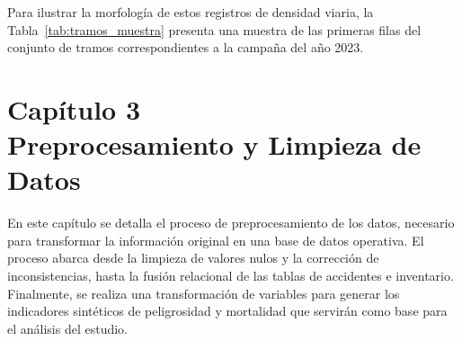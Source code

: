 \documentclass[twoside,a4paper,12pt,onecolumn,openany]{book}
\begin{document}
Para ilustrar la morfología de estos registros de densidad viaria, la Tabla~\ref{tab:tramos_muestra} presenta una muestra de las primeras filas del conjunto de tramos correspondientes a la campaña del año 2023.

\begin{table}[htbp]
\centering
\caption{Muestra de las primeras filas de la Base de Datos de Tramos (Año 2023).}
\vspace{0.3cm}
\label{tab:tramos_muestra}
\end{table}



\setcounter{chapter}{3}
\chapter*{Capítulo 3 \\ \vspace{1cm} Preprocesamiento y Limpieza de Datos}

En este capítulo se detalla el proceso de preprocesamiento de los datos, necesario para transformar la información original en una base de datos operativa. El proceso abarca desde la limpieza de valores nulos y la corrección de inconsistencias, hasta la fusión relacional de las tablas de accidentes e inventario. Finalmente, se realiza una transformación de variables para generar los indicadores sintéticos de peligrosidad y mortalidad que servirán como base para el análisis del estudio.
\end{document}
